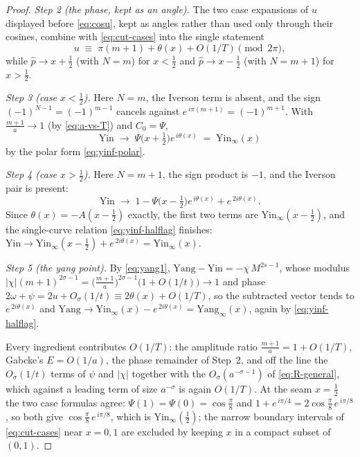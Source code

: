 \documentclass[11pt]{article}
\theoremstyle{definition}
\begin{document}
\begin{proof}
\emph{Step 2 (the phase, kept as an angle).} The two case expansions of
$u$ displayed before \eqref{eq:cosu}, kept as angles rather than used
only through their cosines, combine with \eqref{eq:cut-cases} into the
single statement
\[
u\;\equiv\;\pi(m+1)+\theta(x)+O(1/T)\pmod{2\pi},
\]
while $\hat p\to x+\tfrac12$ (with $N=m$) for $x<\tfrac12$ and
$\hat p\to x-\tfrac12$ (with $N=m+1$) for $x>\tfrac12$.

\emph{Step 3 (case $x<\tfrac12$).} Here $N=m$, the Iverson term is
absent, and the sign $(-1)^{N-1}=(-1)^{m-1}$ cancels against
$e^{\,i\pi(m+1)}=(-1)^{m+1}$. With $\tfrac{m+1}a\to1$ (by
\eqref{eq:a-vs-T}) and $C_0=\Psi$,
\[
\mathrm{Yin}\;\longrightarrow\;
\Psi\bigl(x+\tfrac12\bigr)e^{\,i\theta(x)}
\;=\;\mathrm{Yin}_{\infty}(x)
\]
by the polar form \eqref{eq:yinf-polar}.

\emph{Step 4 (case $x>\tfrac12$).} Here $N=m+1$, the sign product is
$-1$, and the Iverson pair is present:
\[
\mathrm{Yin}\;\longrightarrow\;
1-\Psi\bigl(x-\tfrac12\bigr)e^{\,i\theta(x)}+e^{\,2i\theta(x)} .
\]
Since $\theta(x)=-A(x-\tfrac12)$ exactly, the first two terms are
$\mathrm{Yin}_{\infty}(x-\tfrac12)$, and the single-curve relation
\eqref{eq:yinf-halflag} finishes:
$\mathrm{Yin}\to\mathrm{Yin}_{\infty}(x-\tfrac12)+e^{\,2i\theta(x)}
=\mathrm{Yin}_{\infty}(x)$.

\emph{Step 5 (the yang point).} By \eqref{eq:yang1},
$\mathrm{Yang}-\mathrm{Yin}=-\chi\,M^{2s-1}$, whose modulus
$|\chi|(m+1)^{2\sigma-1}=\bigl(\tfrac{m+1}a\bigr)^{2\sigma-1}
\bigl(1+O(1/t)\bigr)\to1$ and phase
$2\omega+\psi=2u+O_\sigma(1/t)\equiv2\theta(x)+O(1/T)$, so the
subtracted vector tends to $e^{\,2i\theta(x)}$ and
$\mathrm{Yang}\to\mathrm{Yin}_{\infty}(x)-e^{\,2i\theta(x)}
=\mathrm{Yang}_{\infty}(x)$, again by \eqref{eq:yinf-halflag}.

Every ingredient contributes $O(1/T)$: the amplitude ratio
$\tfrac{m+1}a=1+O(1/T)$, Gabcke's $E=O(1/a)$, the phase remainder of
Step~2, and off the line the $O_\sigma(1/t)$ terms of $\psi$ and
$|\chi|$ together with the $O_\sigma(a^{-\sigma-1})$ of
\eqref{eq:R-general}, which against a leading term of size $a^{-\sigma}$ is
again $O(1/T)$. At
the seam $x=\tfrac12$ the two case formulas agree:
$\Psi(1)=\Psi(0)=\cos\tfrac\pi8$ and
$1+e^{\,i\pi/4}=2\cos\tfrac\pi8\,e^{\,i\pi/8}$, so both give
$\cos\tfrac\pi8\,e^{\,i\pi/8}$, which is
$\mathrm{Yin}_{\infty}(\tfrac12)$; the narrow boundary intervals of
\eqref{eq:cut-cases} near $x=0,1$ are excluded by keeping $x$ in a
compact subset of $(0,1)$.
\end{proof}
\end{document}
